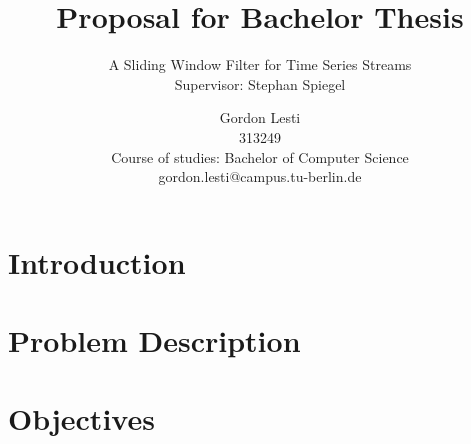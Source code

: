 \documentclass[runningheads,a4paper]{llncs}
\begin{document}
    \graphicspath{ {../img/} }
    \mainmatter

    \title{Proposal for Bachelor Thesis}
    \subtitle{A Sliding Window Filter for Time Series Streams\\
    \textnormal{\small{Supervisor: Stephan Spiegel\\\vspace{1\baselineskip}}}}


    \author{Gordon Lesti\\313249\\Course of studies: Bachelor of Computer Science\\gordon.lesti@campus.tu-berlin.de\\\vspace{5\baselineskip}}



    \maketitle
    \newpage

    \section{Introduction}

    \section{Problem Description}

    \section{Objectives}
\end{document}
